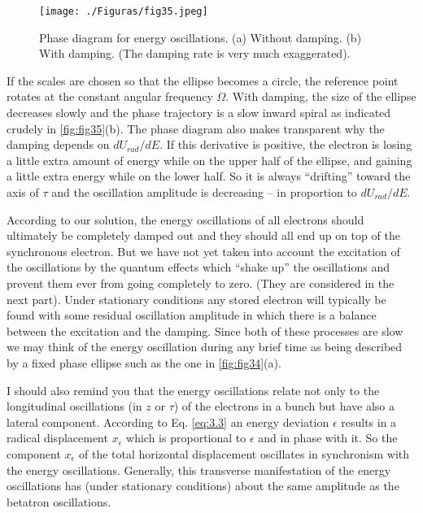 \begin{figure}[!htb]
	\centering
	\texttt{[image: ./Figuras/fig35.jpeg]}
	\caption{Phase diagram for energy oscillations. (a) Without damping. (b) With damping. (The damping rate is very much exaggerated).}
	\label{fig:fig35}
\end{figure}

If the scales are chosen so that the ellipse becomes a circle, the reference point rotates at the constant angular frequency $\Omega$. With damping, the size of the ellipse decreases slowly and the phase trajectory is a slow inward spiral as indicated crudely in \autoref{fig:fig35}(b). The phase diagram also makes transparent why the damping depends on $dU_{rad}/dE$. If this derivative is positive, the electron is losing a little extra amount of energy while on the upper half of the ellipse, and gaining a little extra energy while on the lower half. So it is always “drifting” toward the axis of $\tau$ and the oscillation amplitude is decreasing -- in proportion to $dU_{rad}/dE$.

According to our solution, the energy oscillations of all electrons should ultimately be completely damped out and they should all end up on top of the synchronous electron. But we have not yet taken into account the excitation of the oscillations by the quantum effects which “shake up” the oscillations and prevent them ever from going completely to zero. (They are considered in the next part). Under stationary conditions any stored electron will typically be found with some residual oscillation amplitude in which there is a balance between the excitation and the damping. Since both of these processes are slow we may think of the energy oscillation during any brief time as being described by a fixed phase ellipse such as the one in \autoref{fig:fig34}(a).

I should also remind you that the energy oscillations relate not only to the longitudinal oscillations (in $z$ or $\tau$) of the electrons in a bunch but have also a lateral component. According to Eq. \eqref{eq:3.3} an energy deviation $\epsilon$ results in a radical displacement $x_\epsilon$ which is proportional to $\epsilon$ and in phase with it. So the component $x_\epsilon$ of the total horizontal displacement oscillates in synchronism with the energy oscillations. Generally, this transverse manifestation of the energy oscillations has (under stationary conditions) about the same amplitude as the betatron oscillations.
